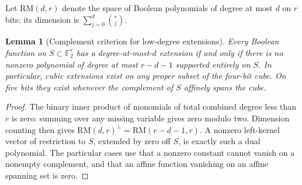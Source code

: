 \documentclass[11pt]{article}
\newtheorem{lemma}[theorem]{Lemma}
\begin{document}
Let $\mathrm{RM}(d,r)$ denote the space of Boolean polynomials of degree
at most $d$ on $r$ bits; its dimension is $\sum_{j=0}^d\binom rj$.
\begin{lemma}[Complement criterion for low-degree extensions]
\label{lem:nonlinear-extension}
Every Boolean function on $S\subset\mathbb F_2^r$ has a degree-at-most-$d$
extension if and only if there is no nonzero polynomial of degree at
most $r-d-1$ supported entirely on $S$. In particular, cubic extensions
exist on any proper subset of the four-bit cube. On five bits they
exist whenever the complement of $S$ affinely spans the cube.
\end{lemma}
\begin{proof}
The binary inner product of monomials of total combined degree less
than $r$ is zero: summing over any missing variable gives zero modulo
two. Dimension counting then gives
$\mathrm{RM}(d,r)^\perp=\mathrm{RM}(r-d-1,r)$.
A nonzero left-kernel vector of restriction to $S$, extended by zero
off $S$, is exactly such a dual polynomial. The particular cases use
that a nonzero constant cannot vanish on a nonempty complement, and
that an affine function vanishing on an affine spanning set is zero.
\end{proof}
\end{document}
